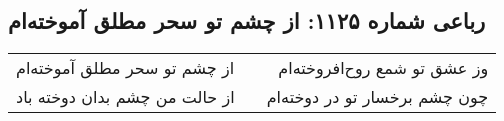 \begin{center}
\section*{رباعی شماره ۱۱۲۵: از چشم تو سحر مطلق آموخته‌ام}
\label{sec:1125}
\begin{longtable}{l p{0.5cm} r}
از چشم تو سحر مطلق آموخته‌ام
&&
وز عشق تو شمع روح‌افروخته‌ام
\\
از حالت من چشم بدان دوخته باد
&&
چون چشم برخسار تو در دوخته‌ام
\\
\end{longtable}
\end{center}
